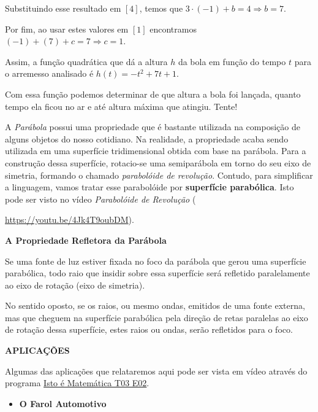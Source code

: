 \begin{example}{}
Substituindo esse resultado em \([4]\), temos que \(3 \cdot (-1)+b=4 \Rightarrow b=7\).

Por fim, ao usar estes valores em \([1]\) encontramos \((-1)+(7)+c=7 \Rightarrow c=1\).

Assim, a função quadrática que dá a altura \(h\) da bola em função do tempo \(t\) para o arremesso analisado é \(h(t)=-t^2+7t+1\).

Com essa função podemos determinar de que altura a bola foi lançada, quanto tempo ela ficou no ar e até altura máxima que atingiu. Tente!
\end{example}


\label{\detokenize{AF209-11:sub-funcao-quadratica-prop-refletora}}\label{\detokenize{AF209-11:a-propriedade-refletora-da-parabola}}
A \emph{Parábola} possui uma propriedade que é bastante utilizada na composição de alguns objetos do nosso cotidiano. Na realidade, a propriedade acaba sendo utilizada em uma superfície tridimensional obtida com base na parábola. Para a construção dessa superfície, rotacio-se uma semiparábola em torno do seu eixo de simetria, formando o chamado \emph{parabolóide de revolução}. Contudo, para simplificar a linguagem, vamos tratar esse parabolóide por \textbf{superfície parabólica}. Isto pode ser visto no vídeo \textit{Parabolóide de Revolução} ({\url{https://youtu.be/4Jk4T9oubDM}).

\begin{observation}{}

\textbf{A Propriedade Refletora da Parábola}

Se uma fonte de luz estiver fixada no foco da parábola que gerou uma superfície parabólica, todo raio que insidir sobre essa superfície será refletido  paralelamente ao eixo de rotação (eixo de simetria).

No sentido oposto, se os raios, ou mesmo ondas, emitidos de uma fonte externa, mas que cheguem na superfície parabólica pela direção de retas paralelas ao eixo de rotação dessa superfície, estes raios ou ondas, serão refletidos para o foco.
\end{observation}

\textbf{APLICAÇÕES}

Algumas das aplicações que relataremos aqui pode ser vista em vídeo através do programa \href{https://youtu.be/X59mM76CL\_g}{Isto é Matemática T03 E02}.
\begin{itemize}
\item {} 
\textbf{O Farol Automotivo}


\end{itemize}}
